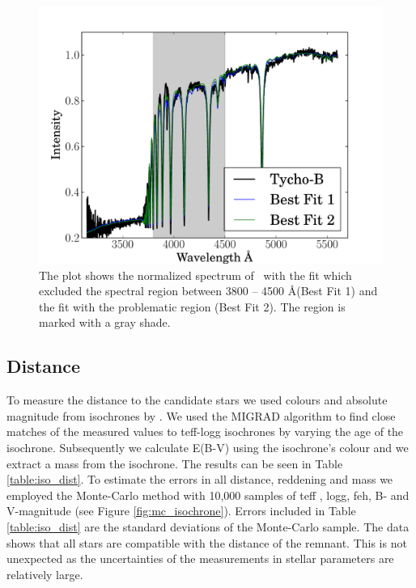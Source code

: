 \begin{figure}[h!]

\includegraphics[width=1.\textwidth]{chapter_sn1572_hires/plots/starb_spec_comp.pdf} 

\caption{The plot shows the normalized spectrum of \starb\ with the fit which excluded the spectral region between 3800 -- 4500 \AA (Best Fit 1) and the fit with the problematic region (Best Fit 2). The region is marked with a gray shade.  }
\label{fig:starb_spec_comp}
\end{figure}

\subsection{Distance}
\label{sec:distance}
To measure the distance to the candidate stars we used colours and absolute magnitude from isochrones by  \citet{2004ApJ...612..168P}. We used the MIGRAD algorithm  \citep{James:1975dr} to find close matches of the measured values to \gls{teff}-\gls{logg} isochrones by varying the age of the isochrone.  Subsequently we calculate E(B-V) using the isochrone's colour and we extract a mass from the isochrone. The results can be seen in Table \ref{table:iso_dist}. To estimate the errors in all distance, reddening and mass we employed the Monte-Carlo
method with 10,000 samples of \gls{teff} , \gls{logg}, \gls{feh}, B- and V-magnitude (see Figure  \ref{fig:mc_isochrone}).  Errors included in Table \ref{table:iso_dist} are the standard deviations of the Monte-Carlo sample. 
The data shows that all stars are compatible with the distance of the remnant. This is not unexpected as the uncertainties of the measurements in stellar parameters are relatively large.




